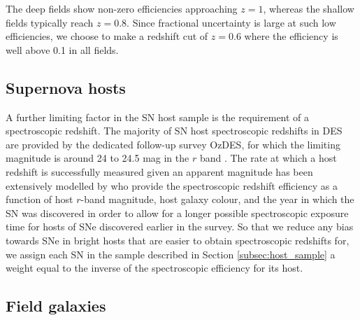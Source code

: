 \documentclass[fleqn,usenatbib]{mnras}
\begin{document}
The deep fields show non-zero efficiencies approaching $z=1$, whereas the shallow fields typically reach $z=0.8$. Since fractional uncertainty is large at such low efficiencies, we choose to make a redshift cut of $z=0.6$ where the efficiency is well above 0.1 in all fields. 

\subsection{Supernova hosts \label{subsec:incompletenss_SN_hosts}}
A further limiting factor in the SN host sample is the requirement of a spectroscopic redshift. The majority of SN host spectroscopic redshifts in DES are provided by the dedicated follow-up survey OzDES, for which the limiting magnitude is around 24 to 24.5 mag in the $r$ band \citep{Lidman2020}. The rate at which a host redshift is successfully measured given an apparent magnitude has been extensively modelled by \citet{Vincenzi2020} who provide the spectroscopic redshift efficiency as a function of host $r$-band magnitude, host galaxy colour, and the year in which the SN was discovered in order to allow for a longer possible spectroscopic exposure time for hosts of SNe discovered earlier in the survey. So that we reduce any bias towards SNe in bright hosts that are easier to obtain spectroscopic redshifts for, we assign each SN in the sample described in Section \ref{subsec:host_sample} a weight equal to the inverse of the spectroscopic efficiency for its host.

\subsection{Field galaxies \label{subsec:incompleteness_field}}
\end{document}
